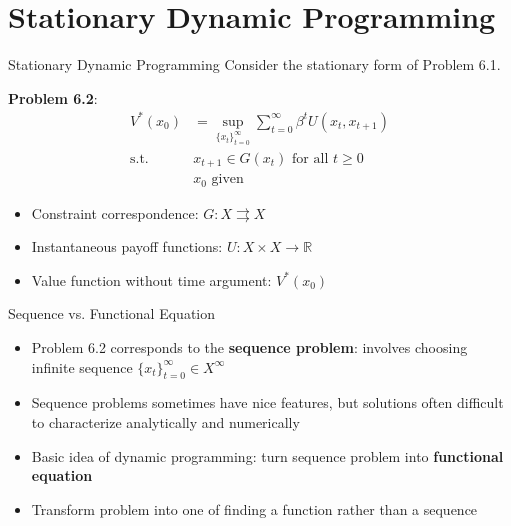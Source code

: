 \documentclass[9pt,aspectratio=169]{beamer}
\newcommand{\R}{\mathbb{R}}
\begin{document}
\section{Stationary Dynamic Programming}

\begin{frame}{Stationary Dynamic Programming}
    Consider the stationary form of Problem 6.1.
    \vspace{0.5cm}
    
    \textbf{Problem 6.2}:
    \begin{align*}
        V^*(x_0) &= \sup_{\{x_t\}_{t=0}^{\infty}} \sum_{t=0}^{\infty} \beta^t U(x_t, x_{t+1})\\
        \text{s.t. } &x_{t+1} \in G(x_t) \text{ for all } t \geq 0\\
        &x_0 \text{ given}
    \end{align*}
\begin{itemize}
\item Constraint correspondence: $G: X \rightrightarrows X$
\item Instantaneous payoff functions: $U: X \times X \to \R$
\item Value function without time argument: $V^*(x_0)$
\end{itemize}
\end{frame}

\begin{frame}{Sequence vs. Functional Equation}
\begin{itemize}
    \item Problem 6.2 corresponds to the \textbf{sequence problem}: involves
    choosing infinite sequence $\{x_t\}_{t=0}^{\infty} \in X^{\infty}$
    \item Sequence problems sometimes have nice features, but solutions often
    difficult to characterize analytically and numerically
    \item Basic idea of dynamic programming: turn sequence problem into
    \textbf{functional equation}
    \item Transform problem into one of finding a function rather than a
    sequence
\end{itemize}
\end{frame}
\end{document}
